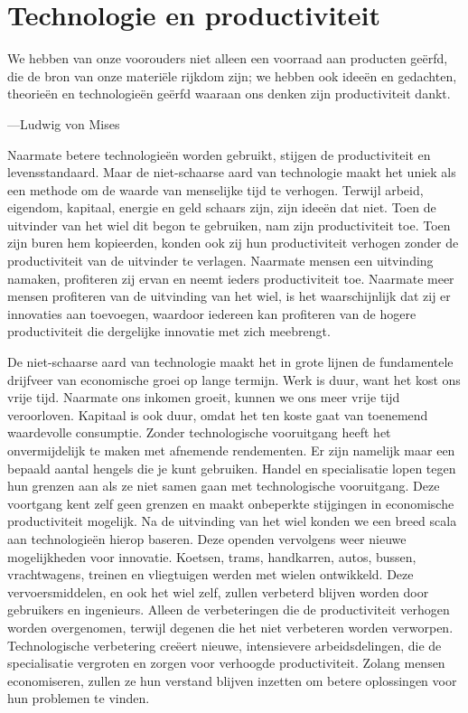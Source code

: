 \hypertarget{technologie-en-productiviteit}{%
\section{Technologie en productiviteit}\label{technologie-en-productiviteit}}

\begin{blockquotebox}
    We hebben van onze voorouders niet alleen een voorraad aan producten geërfd, die de bron van onze materiële rijkdom zijn; we hebben ook ideeën en gedachten, theorieën en technologieën geërfd waaraan ons denken zijn productiviteit dankt.\footnotemark
    \par\raggedleft---Ludwig von Mises
\end{blockquotebox}

Naarmate betere technologieën worden gebruikt, stijgen de productiviteit en levensstandaard. Maar de niet-schaarse aard van technologie maakt het uniek als een methode om de waarde van menselijke tijd te verhogen. Terwijl arbeid, eigendom, kapitaal, energie en geld schaars zijn, zijn ideeën dat niet. Toen de uitvinder van het wiel dit begon te gebruiken, nam zijn productiviteit toe. Toen zijn buren hem kopieerden, konden ook zij hun productiviteit verhogen zonder de productiviteit van de uitvinder te verlagen. Naarmate mensen een uitvinding namaken, profiteren zij ervan en neemt ieders productiviteit toe. Naarmate meer mensen profiteren van de uitvinding van het wiel, is het waarschijnlijk dat zij er innovaties aan toevoegen, waardoor iedereen kan profiteren van de hogere productiviteit die dergelijke innovatie met zich meebrengt.

De niet-schaarse aard van technologie maakt het in grote lijnen de fundamentele drijfveer van economische groei op lange termijn. Werk is duur, want het kost ons vrije tijd. Naarmate ons inkomen groeit, kunnen we ons meer vrije tijd veroorloven. Kapitaal is ook duur, omdat het ten koste gaat van toenemend waardevolle consumptie. Zonder technologische vooruitgang heeft het onvermijdelijk te maken met afnemende rendementen. Er zijn namelijk maar een bepaald aantal hengels die je kunt gebruiken. Handel en specialisatie lopen tegen hun grenzen aan als ze niet samen gaan met technologische vooruitgang. Deze voortgang kent zelf geen grenzen en maakt onbeperkte stijgingen in economische productiviteit mogelijk. Na de uitvinding van het wiel konden we een breed scala aan technologieën hierop baseren. Deze openden vervolgens weer nieuwe mogelijkheden voor innovatie. Koetsen, trams, handkarren, auto\textquotesingle s, bussen, vrachtwagens, treinen en vliegtuigen werden met wielen ontwikkeld. Deze vervoersmiddelen, en ook het wiel zelf, zullen verbeterd blijven worden door gebruikers en ingenieurs. Alleen de verbeteringen die de productiviteit verhogen worden overgenomen, terwijl degenen die het niet verbeteren worden verworpen. Technologische verbetering creëert nieuwe, intensievere arbeidsdelingen, die de specialisatie vergroten en zorgen voor verhoogde productiviteit. \autocite{76} Zolang mensen economiseren, zullen ze hun verstand blijven inzetten om betere oplossingen voor hun problemen te vinden.

